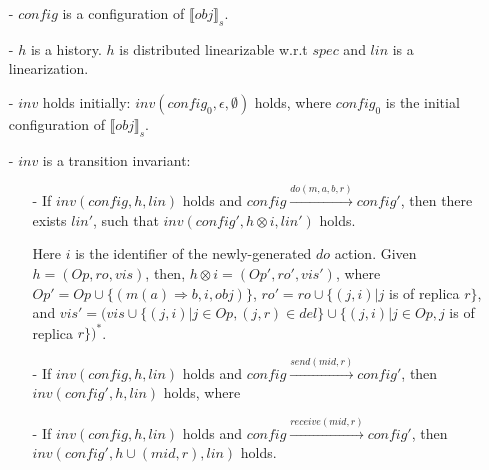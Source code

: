 \begin{itemize}
\setlength{\itemsep}{0.5pt}
\item[-] $\mathit{config}$ is a configuration of $\llbracket \mathit{obj} \rrbracket_s$.

\item[-] $h$ is a history. $h$ is distributed linearizable w.r.t $\mathit{spec}$ and $\mathit{lin}$ is a linearization.


\item[-] $\mathit{inv}$ holds initially: $\mathit{inv}(\mathit{config}_0,\epsilon,\emptyset)$ holds, where $\mathit{config}_0$ is the initial configuration of $\llbracket \mathit{obj} \rrbracket_s$. 

\item[-] $\mathit{inv}$ is a transition invariant:

    \begin{itemize}
    \setlength{\itemsep}{0.5pt}
    \item[-] If $\mathit{inv}(\mathit{config},h,\mathit{lin})$ holds and $\mathit{config} {\xrightarrow{\mathit{do}(m,a,b,r)}} \mathit{config}'$, then there exists $\mathit{lin}'$, such that $\mathit{inv}(\mathit{config}', h \otimes i, \mathit{lin}')$ holds.
        
        Here $i$ is the identifier of the newly-generated $\mathit{do}$ action. Given $h = (\mathit{Op},\mathit{ro},\mathit{vis})$, then, $h \otimes i = (\mathit{Op}',\mathit{ro}',\mathit{vis}')$, where $\mathit{Op}' = \mathit{Op} \cup \{ (m(a) \Rightarrow b,i,\mathit{obj}) \}$, $\mathit{ro}' = \mathit{ro} \cup \{ (j,i) \vert j$ is of replica $r \}$, and $\mathit{vis}' = (\mathit{vis} \cup \{ (j,i) \vert j \in \mathit{Op},(j,r) \in \mathit{del} \} \cup \{ (j,i) \vert j \in \mathit{Op}, j$ is of replica $r \})^*$.
    
    \item[-] If $\mathit{inv}(\mathit{config},h,\mathit{lin})$ holds and $\mathit{config} {\xrightarrow{\mathit{send}(\mathit{mid},r)}} \mathit{config}'$, then $\mathit{inv}(\mathit{config}',h,\mathit{lin})$ holds, where 
        
        

    \item[-] If $\mathit{inv}(\mathit{config},h,\mathit{lin})$ holds and $\mathit{config} {\xrightarrow{\mathit{receive}(\mathit{mid},r)}} \mathit{config}'$, then $\mathit{inv}(\mathit{config}',h \cup (\mathit{mid},r),\mathit{lin})$ holds. 
    \end{itemize}
\end{itemize}

